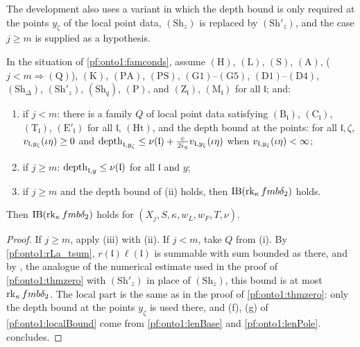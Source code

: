 The development also uses a variant in which the depth bound is only required at the points $y_\zeta$ of the
local point data, $(\mathrm{Sh}_z)$ is replaced by $(\mathrm{Sh}'_z)$, and the case $j\ge m$ is supplied as a hypothesis.

\begin{corollary}\label{pf:onto1:thmzero-refined}
In the situation of \cref{pf:onto1:famconds}, assume $(\mathrm H)$, $(\mathrm L)$, $(\mathrm S)$, $(\mathrm A)$, ($j<m\Rightarrow
(\mathrm Q)$), $(\mathrm K)$, $(\mathrm{PA})$, $(\mathrm{PS})$, $(\mathrm G1)$--$(\mathrm G5)$, $(\mathrm D1)$--$(\mathrm D4)$,
$(\mathrm{Sh}_\Delta)$, $(\mathrm{Sh}'_z)$, $(\mathrm{Sh}_q)$, $(\mathrm P)$, and $(\mathrm Z_{\mathfrak l})$, $(\mathrm M_{\mathfrak l})$ for
all $\mathfrak l$; and:
\begin{enumerate}[label=(\roman*)]
\item if $j<m$: there is a family $Q$ of local point data satisfying $(\mathrm B_{\mathfrak l})$, $(\mathrm C_{\mathfrak l})$,
$(\mathrm T_{\mathfrak l})$, $(\mathrm E'_{\mathfrak l})$ for all $\mathfrak l$, $(\mathrm{Ht})$, and the depth bound at the points:
for all $\mathfrak l,\zeta$, $v_{\mathfrak l,y_\zeta}(\iota\eta)\ge0$ and $\operatorname{depth}_{\mathfrak l,y_\zeta}\le\nu(\mathfrak
l)+\frac c{2i_\eta}v_{\mathfrak l,y_\zeta}(\iota\eta)$ when $v_{\mathfrak l,y_\zeta}(\iota\eta)<\infty$;
\item if $j\ge m$: $\operatorname{depth}_{\mathfrak l,y}\le\nu(\mathfrak l)$ for all $\mathfrak l$ and $y$;
\item if $j\ge m$ and the depth bound of (ii) holds, then $\mathrm{IB}(\operatorname{rk}_\kappa fmb\delta_2)$ holds.
\end{enumerate}
Then $\mathrm{IB}(\operatorname{rk}_\kappa fmb\delta_2)$ holds for $(X_j,S,\kappa,w_L,w_F,T,\nu)$.
\end{corollary}

\begin{proof}
If $j\ge m$, apply (iii) with (ii). If $j<m$, take $Q$ from (i). By \cref{pf:onto1:rLa_tsum}, $r(\mathfrak l)\ell(\mathfrak l)$
is summable with sum bounded as there, and by , the
analogue of the numerical estimate used in the proof of \cref{pf:onto1:thmzero} with $(\mathrm{Sh}'_z)$ in place of
$(\mathrm{Sh}_z)$, this bound is at most $\operatorname{rk}_\kappa fmb\delta_2$. The local part is the same as in the proof of
\cref{pf:onto1:thmzero}: only the depth bound at the points $y_\zeta$ is used there, and (f), (g) of
\cref{pf:onto1:localBound} come from \cref{pf:onto1:lenBase} and \cref{pf:onto1:lenPole}.  concludes.
\end{proof}


